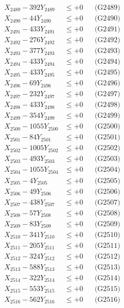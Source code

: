 \documentclass[a4paper,10pt]{article}
\begin{document}
{\begin{align}
X_{2489} - 392Y_{2489} &\leq +0 && \text{(G2489)} \\
X_{2490} - 44Y_{2490} &\leq +0 && \text{(G2490)} \\
\allowbreak
X_{2491} - 433Y_{2491} &\leq +0 && \text{(G2491)} \\
X_{2492} - 276Y_{2492} &\leq +0 && \text{(G2492)} \\
X_{2493} - 377Y_{2493} &\leq +0 && \text{(G2493)} \\
X_{2494} - 433Y_{2494} &\leq +0 && \text{(G2494)} \\
X_{2495} - 433Y_{2495} &\leq +0 && \text{(G2495)} \\
X_{2496} - 69Y_{2496} &\leq +0 && \text{(G2496)} \\
X_{2497} - 232Y_{2497} &\leq +0 && \text{(G2497)} \\
X_{2498} - 433Y_{2498} &\leq +0 && \text{(G2498)} \\
X_{2499} - 354Y_{2499} &\leq +0 && \text{(G2499)} \\
X_{2500} - 1055Y_{2500} &\leq +0 && \text{(G2500)} \\
\allowbreak
X_{2501} - 84Y_{2501} &\leq +0 && \text{(G2501)} \\
X_{2502} - 1005Y_{2502} &\leq +0 && \text{(G2502)} \\
X_{2503} - 493Y_{2503} &\leq +0 && \text{(G2503)} \\
X_{2504} - 1055Y_{2504} &\leq +0 && \text{(G2504)} \\
X_{2505} - 4Y_{2505} &\leq +0 && \text{(G2505)} \\
X_{2506} - 49Y_{2506} &\leq +0 && \text{(G2506)} \\
X_{2507} - 438Y_{2507} &\leq +0 && \text{(G2507)} \\
X_{2508} - 57Y_{2508} &\leq +0 && \text{(G2508)} \\
X_{2509} - 83Y_{2509} &\leq +0 && \text{(G2509)} \\
X_{2510} - 341Y_{2510} &\leq +0 && \text{(G2510)} \\
\allowbreak
X_{2511} - 205Y_{2511} &\leq +0 && \text{(G2511)} \\
X_{2512} - 324Y_{2512} &\leq +0 && \text{(G2512)} \\
X_{2513} - 588Y_{2513} &\leq +0 && \text{(G2513)} \\
X_{2514} - 322Y_{2514} &\leq +0 && \text{(G2514)} \\
X_{2515} - 553Y_{2515} &\leq +0 && \text{(G2515)} \\
X_{2516} - 562Y_{2516} &\leq +0 && \text{(G2516)} \\

\end{align}}
\end{document}

